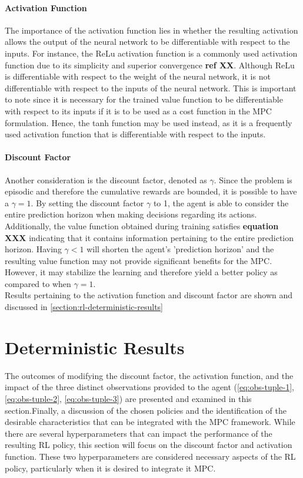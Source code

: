\paragraph{Activation Function} The importance of the activation function lies in whether the resulting activation allows the output of the neural network to be differentiable with respect to the inputs. For instance, the ReLu activation function is a commonly used activation function due to its simplicity and superior convergence \textbf{ref XX}. Although ReLu is differentiable with respect to the weight of the neural network, it is not differentiable with respect to the inputs of the neural network. This is important to note since it is necessary for the trained value function to be differentiable with respect to its inputs if it is to be used as a cost function in the MPC formulation. Hence, the tanh function may be used instead, as it is a frequently used activation function that is differentiable with respect to the inputs.

\paragraph{Discount Factor} Another consideration is the discount factor, denoted as $\gamma$. Since the problem is episodic and therefore the cumulative rewards are bounded, it is possible to have a $\gamma = 1$. By setting the discount factor $\gamma$ to 1, the agent is able to consider the entire prediction horizon when making decisions regarding its actions. Additionally, the value function obtained during training satisfies \textbf{equation XXX} indicating that it contains information pertaining to the entire prediction horizon. Having $\gamma < 1$ will shorten the agent's 'prediction horizon' and the resulting value function may not provide significant benefits for the MPC. However, it may stabilize the learning and therefore yield a better policy as compared to when $\gamma = 1$. \\
Results pertaining to the activation function and discount factor are shown and discussed in \autoref{section:rl-deterministic-results}





\section{Deterministic Results}
The outcomes of modifying the discount factor, the activation function, and the impact of the three distinct observations provided to the agent (\autoref{eq:obs-tuple-1}, \autoref{eq:obs-tuple-2}, \autoref{eq:obs-tuple-3}) are presented and examined in this section.Finally, a discussion of the chosen policies and the identification of the desirable characteristics that can be integrated with the MPC framework. While there are several hyperparameters that can impact the performance of the resulting RL policy, this section will focus on the discount factor and activation function. These two hyperparameters are considered necessary aspects of the RL policy, particularly when it is desired to integrate it MPC.


